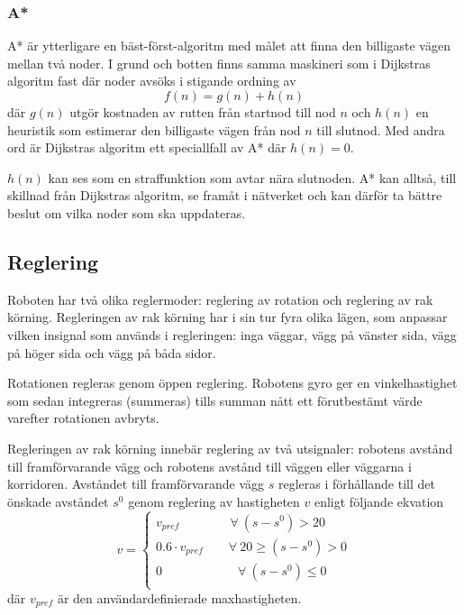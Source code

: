 \documentclass[11pt]{article}
\begin{document}
\begin{flushleft}
\subsubsection{A*}
A* är ytterligare en bäst-först-algoritm med målet att finna den billigaste vägen mellan två noder. I grund och botten finns samma maskineri som i Dijkstras algoritm fast där noder avsöks i stigande ordning av
\begin{equation*}
	f(n) = g(n) + h(n)
\end{equation*}
där $g(n)$ utgör kostnaden av rutten från startnod till nod $n$ och $h(n)$ en heuristik som estimerar den billigaste vägen från nod $n$ till slutnod. Med andra ord är Dijkstras algoritm ett speciallfall av A* där $h(n) = 0$.

$h(n)$ kan ses som en straffunktion som avtar nära slutnoden. A* kan alltså, till skillnad från Dijkstras algoritm, se framåt i nätverket och kan därför ta bättre beslut om vilka noder som ska uppdateras.

\subsection{Reglering}\label{subsection:reglering}
Roboten har två olika reglermoder: reglering av rotation och reglering av rak körning. Regleringen av rak körning har i sin tur fyra olika lägen, som anpassar vilken insignal som används i regleringen: inga väggar, vägg på vänster sida, vägg på höger sida och vägg på båda sidor.

Rotationen regleras genom öppen reglering. Robotens gyro ger en vinkelhastighet som sedan integreras (summeras) tills summan nått ett förutbestämt värde varefter rotationen avbryts.

Regleringen av rak körning innebär reglering av två utsignaler: robotens avstånd till framförvarande vägg och robotens avstånd till väggen eller väggarna i korridoren. Avståndet till framförvarande vägg $s$ regleras i förhållande till det önskade avståndet $s^0$ genom reglering av hastigheten $v$ enligt följande ekvation
\begin{equation*}
	v = 
	\begin{cases}
		v_{pref} \qquad\qquad \forall \ (s - s^0) > 20 \\
		0.6 \cdot v_{pref} \qquad \forall \ 20 \geq (s - s^0) > 0 \\
		0 \qquad\qquad\qquad \forall \ (s - s^0)\leq 0 \\
	\end{cases}
\end{equation*}
där $v_{pref}$ är den användardefinierade maxhastigheten.


\end{flushleft}
\end{document}
